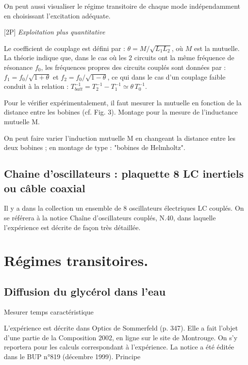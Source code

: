 \documentclass{article}%
\begin{document}
On peut aussi visualiser le régime transitoire de chaque mode indépendamment en choisissant l'excitation adéquate.

[2P] \textit{Exploitation plus quantitative}

Le coefficient de couplage est défini par : $\theta = M/\sqrt{L_1L_2}$, où $M$ est la mutuelle. La théorie indique que, dans le cas où les 2 circuits ont la même fréquence de résonance $f_0$, les fréquences propres des circuits couplés sont données par : $f_1 = f_0/\sqrt{1+\theta}$ et $f_2 = f_0/\sqrt{1-\theta}$, ce qui dans le cas d'un couplage faible conduit à la relation : $T^{-1}_{batt} = T^{-1}_2 - T^{-1}_1 \simeq \theta \, T^{-1}_0$.

Pour le vérifier expérimentalement, il faut mesurer la mutuelle en fonction de la distance entre les bobines (cf. Fig. 3).
Montage pour la mesure de l'inductance mutuelle M.

On peut faire varier l'induction mutuelle M en changeant la distance entre les deux bobines ; en montage de type : "bobines de Helmholtz". 

\subsection{Chaine d'oscillateurs : plaquette 8 LC inertiels ou câble coaxial}

Il y a dans la collection un ensemble de 8 oscillateurs électriques LC couplés. On se référera à la notice Chaîne d'oscillateurs couplés, N.40, dans laquelle l'expérience est décrite de façon très détaillée. 

\section{Régimes transitoires.}
\subsection{Diffusion du glycérol dans l'eau}
Mesurer temps caractéristique

L'expérience est décrite dans Optics de Sommerfeld (p. 347). Elle a fait l'objet d'une partie de la Composition 2002, en ligne sur le site de Montrouge. On s'y reportera pour les calculs correspondant à l'expérience. La notice a été éditée dans le BUP n°819 (décembre 1999).
Principe
\end{document}
